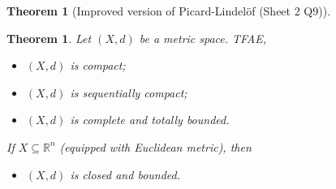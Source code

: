\documentclass{article}
\theoremstyle{definition}
\theoremstyle{remark}
\theoremstyle{plain}
\newtheorem{thm}[defn]{Theorem}
\theoremstyle{definition}
\newcommand{\RR}{\mathbb{R}}
\begin{document}
\begin{thm}[Improved version of Picard-Lindelöf (Sheet 2 Q9)]
    
\end{thm}
\begin{thm}
    Let $(X,d)$ be a metric space. TFAE,
    \begin{itemize}
        \item $(X,d)$ is compact;
        \item $(X,d)$ is sequentially compact;
        \item $(X,d)$ is complete and totally bounded.
    \end{itemize}
    If $X\subseteq\RR^n$ (equipped with Euclidean metric), then 
    \begin{itemize}
        \item $(X,d)$ is closed and bounded.
    \end{itemize}
\end{thm}
\end{document}
